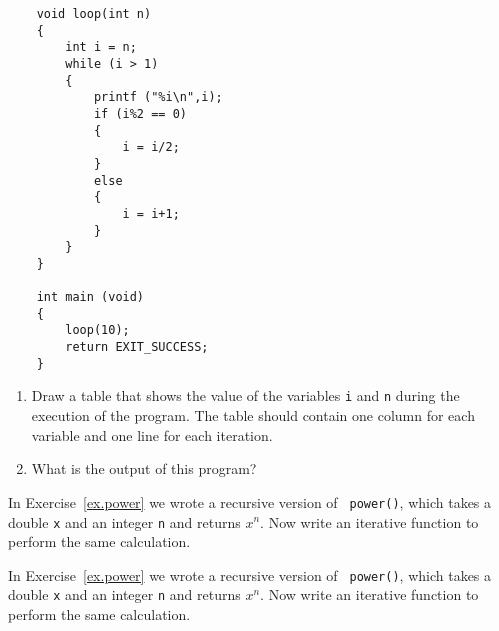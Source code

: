 

\begin{exercise}\label{infloop}
\begin{verbatim}
    void loop(int n) 
    {
        int i = n;
        while (i > 1) 
        {
            printf ("%i\n",i);
            if (i%2 == 0) 
            {
                i = i/2;
            } 
            else 
            {
                i = i+1;
            }
        }
    }

    int main (void) 
    {
        loop(10);
        return EXIT_SUCCESS;
    }
\end{verbatim}
%
\begin{enumerate}

\item  Draw a table that shows the value of the variables {\tt i} and {\tt n} during the execution of the program. 
The table should contain one column for each variable and one line for each iteration.


\item What is the output of this program?

\end{enumerate}
\end{exercise}



\begin{exercise}
In Exercise~\ref{ex.power} we wrote a recursive version of {\tt
power()}, which takes a double {\tt x} and an integer {\tt n} and
returns $x^n$.  Now write an iterative function to perform the same
calculation.
\end{exercise}




\begin{exercise}
	In Exercise~\ref{ex.power} we wrote a recursive version of {\tt
		power()}, which takes a double {\tt x} and an integer {\tt n} and
	returns $x^n$.  Now write an iterative function to perform the same
	calculation.
\end{exercise}


